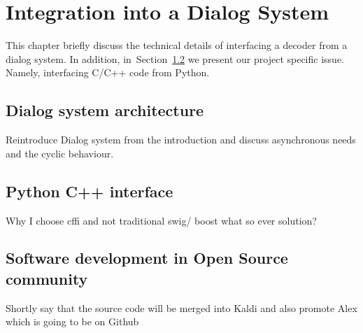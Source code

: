 \chapter{Integration into a Dialog System}
\label{cha:integration}
This chapter briefly discuss the technical details of interfacing
a decoder from a dialog system.
In addition, in~Section~\ref{sec:python_c_interface} we present our project specific issue.
Namely, interfacing C/C++ code from Python.

\section{Dialog system architecture} 
\label{sec:dialog_system_architecture}
Reintroduce Dialog system from the introduction and discuss asynchronous needs
and the cyclic behaviour.



\section{Python C++ interface} 
\label{sec:python_c_interface}
Why I choose cffi and not traditional swig/ boost what so ever solution?


\section{Software development in Open Source community} 
\label{sec:software_development_in_open_source_community}
Shortly say that the source code will be merged into Kaldi 
and also promote Alex which is going to be on Github




